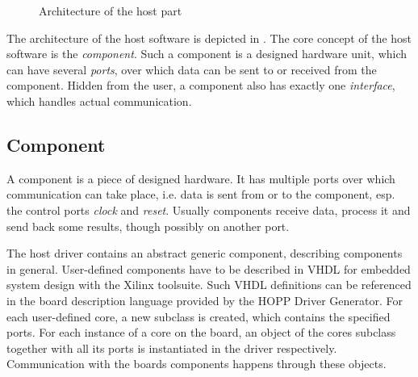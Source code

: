\documentclass{report}
\begin{document}
\begin{figure}
\caption{Architecture of the host part}
\label{fig:archHost}
\end{figure}

The architecture of the host software is depicted in . The core concept of the host software is the \textit{component}. Such a component is a designed hardware unit, which can have several \textit{ports}, over which data can be sent to or received from the component. Hidden from the user, a component also has exactly one \textit{interface}, which handles actual communication.

\subsection{Component}
A component is a piece of designed hardware. It has multiple ports over which communication can take place, i.e. data is sent from or to the component, esp. the control ports \textit{clock} and \textit{reset}. Usually components receive data, process it and send back some results, though possibly on another port.

The host driver contains an abstract generic component, describing components in general. User-defined components have to be described in VHDL for embedded system design with the Xilinx toolsuite. Such VHDL definitions can be referenced in the board description language provided by the HOPP Driver Generator. For each user-defined core, a new subclass is created, which contains the specified ports. For each instance of a core on the board, an object of the cores subclass together with all its ports is instantiated in the driver respectively. Communication with the boards components happens through these objects.
\end{document}
